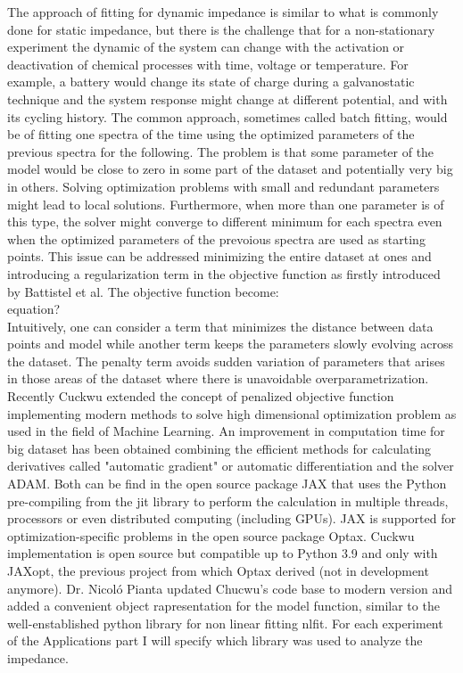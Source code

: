 The approach of fitting for dynamic impedance is similar to what is commonly done for static impedance, but there is the challenge that for a non-stationary experiment the dynamic of the system can change with the activation or deactivation of chemical processes with time, voltage or temperature. For example, a battery would change its state of charge during a galvanostatic technique and the system response might change at different potential, and with its cycling history.  The common approach, sometimes called batch fitting, would be of fitting one spectra of the time using the optimized parameters of the previous spectra for the following. The problem is that some parameter of the model would be close to zero in some part of the dataset and potentially very big in others. Solving optimization problems with small and redundant parameters might lead to local solutions. Furthermore, when more than one parameter is of this type, the solver might converge to different minimum for each spectra even when the optimized parameters of the prevoious spectra are used as starting points. This issue can be addressed minimizing the entire dataset at ones and introducing a regularization term in the objective function as firstly introduced by Battistel et al. The objective function become: \\

equation?\\

Intuitively, one can consider a term that minimizes the distance between data points and model while another term keeps the parameters slowly evolving across the dataset. The penalty term avoids sudden variation of parameters that arises in those areas of the dataset where there is unavoidable overparametrization.
Recently Cuckwu extended the concept of  penalized objective function implementing modern methods to solve high dimensional optimization problem as used in the field of Machine Learning. An improvement in computation time for big dataset has been obtained combining the efficient methods for calculating derivatives called "automatic gradient" or automatic differentiation and the solver ADAM. Both can be find in the open source package JAX that uses the Python pre-compiling from the jit library to perform the calculation in multiple threads, processors or even distributed computing (including GPUs). JAX is supported for optimization-specific problems in the open source package Optax. Cuckwu implementation is open source but compatible up to Python 3.9 and only with JAXopt, the previous project from which Optax derived (not in development anymore). Dr. Nicoló Pianta updated Chucwu's code base to modern version and added a convenient object rapresentation for the model function, similar to the well-enstablished python library for non linear fitting nlfit. For each experiment of the Applications part I will specify which library was used to analyze the impedance.\\

